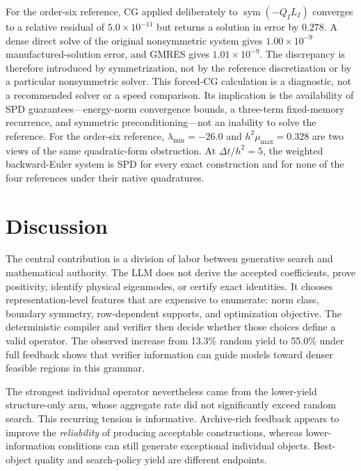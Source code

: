 \documentclass[lineno,pdflatex,sn-nature]{sn-jnl}
\theoremstyle{thmstyleone}
\begin{document}
For the order-six reference, CG applied deliberately to $\operatorname{sym}(-Q_IL_I)$ converges to a relative residual of $5.0\times10^{-11}$ but returns a solution in error by $0.278$. A dense direct solve of the original nonsymmetric system gives $1.00\times10^{-9}$ manufactured-solution error, and GMRES gives $1.01\times10^{-9}$. The discrepancy is therefore introduced by symmetrization, not by the reference discretization or by a particular nonsymmetric solver. This forced-CG calculation is a diagnostic, not a recommended solver or a speed comparison. Its implication is the availability of SPD guarantees---energy-norm convergence bounds, a three-term fixed-memory recurrence, and symmetric preconditioning---not an inability to solve the reference. For the order-six reference, $\lambda_{\min}=-26.0$ and $h^2\mu_{\max}=0.328$ are two views of the same quadratic-form obstruction. At $\Delta t/h^2=5$, the weighted backward-Euler system is SPD for every exact construction and for none of the four references under their native quadratures.

\section{Discussion}
The central contribution is a division of labor between generative search and mathematical authority. The LLM does not derive the accepted coefficients, prove positivity, identify physical eigenmodes, or certify exact identities. It chooses representation-level features that are expensive to enumerate: norm class, boundary symmetry, row-dependent supports, and optimization objective. The deterministic compiler and verifier then decide whether those choices define a valid operator. The observed increase from 13.3\% random yield to 55.0\% under full feedback shows that verifier information can guide models toward denser feasible regions in this grammar.

The strongest individual operator nevertheless came from the lower-yield structure-only arm, whose aggregate rate did not significantly exceed random search. This recurring tension is informative. Archive-rich feedback appears to improve the \emph{reliability} of producing acceptable constructions, whereas lower-information conditions can still generate exceptional individual objects. Best-object quality and search-policy yield are different endpoints.
\end{document}
